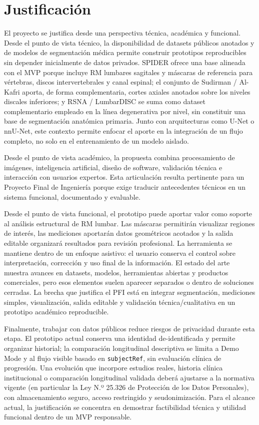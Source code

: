 \chapter{Justificación}

El proyecto se justifica desde una perspectiva técnica, académica y funcional. Desde el punto de vista técnico, la disponibilidad de datasets públicos anotados y de modelos de segmentación médica permite construir prototipos reproducibles sin depender inicialmente de datos privados. SPIDER ofrece una base alineada con el MVP porque incluye RM lumbares sagitales y máscaras de referencia para vértebras, discos intervertebrales y canal espinal; el conjunto de Sudirman / Al-Kafri aporta, de forma complementaria, cortes axiales anotados sobre los niveles discales inferiores; y RSNA / LumbarDISC se suma como dataset complementario empleado en la línea degenerativa por nivel, sin constituir una base de segmentación anatómica primaria. Junto con arquitecturas como U-Net o nnU-Net, este contexto permite enfocar el aporte en la integración de un flujo completo, no solo en el entrenamiento de un modelo aislado.

Desde el punto de vista académico, la propuesta combina procesamiento de imágenes, inteligencia artificial, diseño de software, validación técnica e interacción con usuarios expertos. Esta articulación resulta pertinente para un Proyecto Final de Ingeniería porque exige traducir antecedentes técnicos en un sistema funcional, documentado y evaluable.

Desde el punto de vista funcional, el prototipo puede aportar valor como soporte al análisis estructural de RM lumbar. Las máscaras permitirán visualizar regiones de interés, las mediciones aportarán datos geométricos acotados y la salida editable organizará resultados para revisión profesional. La herramienta se mantiene dentro de un enfoque asistivo: el usuario conserva el control sobre interpretación, corrección y uso final de la información. El estado del arte muestra avances en datasets, modelos, herramientas abiertas y productos comerciales, pero esos elementos suelen aparecer separados o dentro de soluciones cerradas. La brecha que justifica el PFI está en integrar segmentación, mediciones simples, visualización, salida editable y validación técnica/cualitativa en un prototipo académico reproducible.

Finalmente, trabajar con datos públicos reduce riesgos de privacidad durante esta etapa. El prototipo actual conserva una identidad de-identificada y permite organizar historial; la comparación longitudinal descriptiva se limita a Demo Mode y al flujo visible basado en \texttt{subjectRef}, sin evaluación clínica de progresión. Una evolución que incorpore estudios reales, historia clínica institucional o comparación longitudinal validada deberá ajustarse a la normativa vigente (en particular la Ley N.º 25.326 de Protección de los Datos Personales), con almacenamiento seguro, acceso restringido y seudonimización. Para el alcance actual, la justificación se concentra en demostrar factibilidad técnica y utilidad funcional dentro de un MVP responsable.
